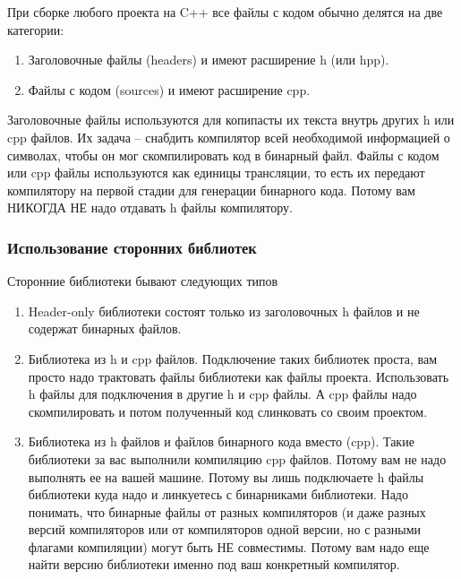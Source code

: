 При сборке любого проекта на C++ все файлы с кодом обычно делятся на две категории:
\begin{enumerate}
\item Заголовочные файлы (headers) и имеют расширение h (или hpp).

\item Файлы с кодом (sources) и имеют расширение cpp.
\end{enumerate}
Заголовочные файлы используются для копипасты их текста внутрь других h или cpp файлов.
Их задача -- снабдить компилятор всей необходимой информацией о символах, чтобы он мог скомпилировать код в бинарный файл.
Файлы с кодом или cpp файлы используются как единицы трансляции, то есть их передают компилятору на первой стадии для генерации бинарного кода.
Потому вам НИКОГДА НЕ надо отдавать h файлы компилятору.

\subsubsection{Использование сторонних библиотек}

Сторонние библиотеки бывают следующих типов
\begin{enumerate}
\item Header-only библиотеки состоят только из заголовочных h файлов и не содержат бинарных файлов.

\item Библиотека из h и cpp файлов.
Подключение таких библиотек проста, вам просто надо трактовать файлы библиотеки как файлы проекта.
Использовать h файлы для подключения в другие h и cpp файлы.
А cpp файлы надо скомпилировать и потом полученный код слинковать со своим проектом.

\item Библиотека из h файлов и файлов бинарного кода вместо (cpp).
Такие библиотеки за вас выполнили компиляцию cpp файлов.
Потому вам не надо выполнять ее на вашей машине.
Потому вы лишь подключаете h файлы библиотеки куда надо и линкуетесь с бинарниками библиотеки.
Надо понимать, что бинарные файлы от разных компиляторов (и даже разных версий компиляторов или от компиляторов одной версии, но с разными флагами компиляции) могут быть НЕ совместимы.
Потому вам надо еще найти версию библиотеки именно под ваш конкретный компилятор.
\end{enumerate}

